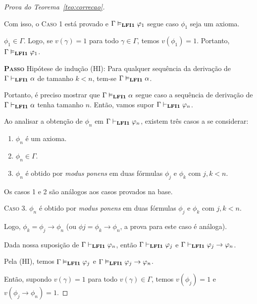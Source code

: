 \begin{proof}[Prova do Teorema~\ref{teo:correcao}]
\begin{provaporcasos}
\begin{provaporsubcasos}
            \end{provaporsubcasos}

            Com isso, o \textsc{Caso 1} está provado e $\Gamma \vDash_{{\normalfont\textbf{LFI1}}{}} \varphi_{1}$ segue caso $\phi_{1}$ seja um axioma.

            \casodeprova{} $\phi_{1} \in \Gamma$. Logo, se $v(\gamma) = 1$ para todo $\gamma \in \Gamma$, temos $v(\phi_{1}) = 1$. Portanto, $\Gamma \vDash_{{\normalfont\textbf{LFI1}}{}} \varphi_{1}$.

        \end{provaporcasos}

         \noindent \textbf{\textsc{Passo}} Hipótese de indução (HI): Para qualquer sequência da derivação de $\Gamma \vdash_{{\normalfont\textbf{LFI1}}{}} \alpha$ de tamanho $k < n$, tem-se $\Gamma \vDash_{{\normalfont\textbf{LFI1}}{}} \alpha$. 
         
         Portanto, é preciso mostrar que $\Gamma \vDash_{{\normalfont\textbf{LFI1}}{}} \alpha$ segue caso a sequência de derivação de $\Gamma \vdash_{{\normalfont\textbf{LFI1}}{}} \alpha$ tenha tamanho $n$. Então, vamos supor $\Gamma \vdash_{{\normalfont\textbf{LFI1}}{}} \varphi_{n}$.
         
         Ao analisar a obtenção de $\phi_{n}$ em $\Gamma \vdash_{{\normalfont\textbf{LFI1}}{}} \varphi_{n}$, existem três casos a se considerar:
         
         \begin{enumerate}
            \item $\phi_{n}$ é um axioma.
            \item $\phi_{n} \in \Gamma$.
            \item $\phi_{n}$ é obtido por \textit{modus ponens} em duas fórmulas $\phi_{j}$ e $\phi_{k}$ com $j, k < n$. 
         \end{enumerate}
         
         Os casos 1 e 2 são análogos aos casos provados na base.
         
         \noindent \textsc{Caso 3.} $\phi_{n}$ é obtido por \textit{modus ponens} em duas fórmulas $\phi_{j}$ e $\phi_{k}$ com $j, k < n$. 
         
         Logo, $\phi_{k} = \phi_{j} \to \phi_{n}$ (ou $\phi{j} = \phi_{k} \to \phi_{n}$, a prova para este caso é análoga). 
         
         Dada nossa suposição de $\Gamma \vdash_{{\normalfont\textbf{LFI1}}{}} \varphi_{n}$, então $\Gamma \vdash_{{\normalfont\textbf{LFI1}}{}} \varphi_{j}$ e $\Gamma \vdash_{{\normalfont\textbf{LFI1}}{}} \varphi_{j} \to \varphi_{n}$. 
         
         Pela (HI), temos $\Gamma \vDash_{{\normalfont\textbf{LFI1}}{}} \varphi_{j}$ e $\Gamma \vDash_{{\normalfont\textbf{LFI1}}{}} \varphi_{j} \to \varphi_{n}$. 
         
         Então, supondo $v(\gamma) = 1$ para todo $v(\gamma) \in \Gamma$, temos $v(\phi_{j}) = 1$ e $v(\phi_{j} \to \phi_{n}) = 1$. 
         

\end{proof}

